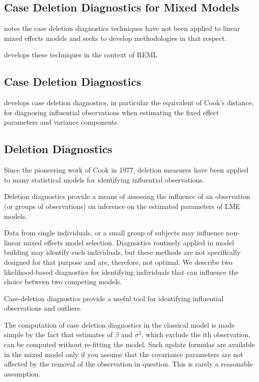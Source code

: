 \documentclass[12pt, a4paper]{report}
\begin{document}
\subsection{Case Deletion Diagnostics for Mixed Models}

\citet{Christiansen} notes the case deletion diagnostics techniques have not been applied to linear mixed effects models and seeks to develop methodologies in that respect.

\citet{Christiansen} develops these techniques in the context of REML


\newpage

\subsection{Case Deletion Diagnostics} %

\citet{CPJ} develops  case deletion diagnostics, in particular the equivalent of  Cook's distance, for diagnosing influential observations when estimating the fixed effect parameters and variance components.

\subsection{Deletion Diagnostics}

Since the pioneering work of Cook in 1977, deletion measures have been applied to many statistical models for identifying influential observations.

Deletion diagnostics provide a means of assessing the influence of an observation (or groups of observations) on inference on the estimated parameters of LME models.

Data from single individuals, or a small group of subjects may influence non-linear mixed effects model selection. Diagnostics routinely applied in model building may identify such individuals, but these methods are not specifically designed for that purpose and are, therefore, not optimal. We describe two likelihood-based diagnostics for identifying individuals that can influence the choice between two competing models.

Case-deletion diagnostics provide a useful tool for identifying influential observations and outliers.

The computation of case deletion diagnostics in the classical model is made simple by the fact that estimates of $\beta$ and $\sigma^2$, which exclude the ith observation, can be computed without re-fitting the model. Such update formulas are available in the mixed model only if you assume that the covariance parameters are not affected by the removal of the observation in question. This is rarely a reasonable assumption.
\end{document}
